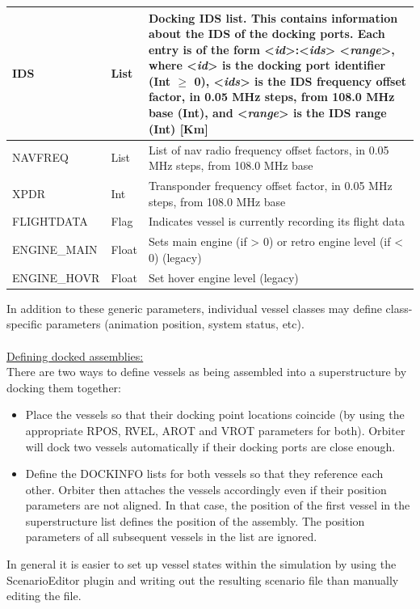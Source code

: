 \documentclass[Orbiter Developer Manual.tex]{subfiles}
\begin{document}
\begin{longtable}{ |p{}|p{}|p{}| }
	\hline\rule{0pt}{2ex}
	IDS & List & Docking IDS list. This contains information about the IDS of the docking ports. Each entry is of the form <\textit{id}>:<\textit{ids}> <\textit{range}>, where <\textit{id}> is the docking port identifier (Int $\geq$ 0), <\textit{ids}> is the IDS frequency offset factor, in 0.05 MHz steps, from 108.0 MHz base (Int), and <\textit{range}> is the IDS range (Int) [Km]\\
	\hline\rule{0pt}{2ex}
	NAVFREQ & List & List of nav radio frequency offset factors, in 0.05 MHz steps, from 108.0 MHz base\\
	\hline\rule{0pt}{2ex}
	XPDR & Int & Transponder frequency offset factor, in 0.05 MHz steps, from 108.0 MHz base\\
	\hline\rule{0pt}{2ex}
	FLIGHTDATA & Flag & Indicates vessel is currently recording its flight data\\
	\hline\rule{0pt}{2ex}
	ENGINE\_MAIN & Float & Sets main engine (if > 0) or retro engine level (if < 0) (legacy)\\
	\hline\rule{0pt}{2ex}
	ENGINE\_HOVR & Float & Set hover engine level (legacy)\\
	\hline
	\end{longtable}

\noindent
In addition to these generic parameters, individual vessel classes may define class-specific parameters (animation position, system status, etc).\\
\\
\underline{Defining docked assemblies:}\\
There are two ways to define vessels as being assembled into a superstructure by docking them together:

\begin{itemize}
\item Place the vessels so that their docking point locations coincide (by using the appropriate RPOS, RVEL, AROT and VROT parameters for both). Orbiter will dock two vessels automatically if their docking ports are close enough.
\item Define the DOCKINFO lists for both vessels so that they reference each other. Orbiter then attaches the vessels accordingly even if their position parameters are not aligned. In that case, the position of the first vessel in the superstructure list defines the position of the assembly. The position parameters of all subsequent vessels in the list are ignored.
\end{itemize}

\noindent
In general it is easier to set up vessel states within the simulation by using the ScenarioEditor plugin and writing out the resulting scenario file than manually editing the file.
\end{document}
